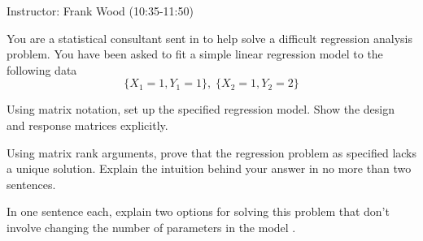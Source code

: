 \documentclass[12pt]{article}
\begin{document}
 \begin{center}
  Instructor: Frank Wood (10:35-11:50) 
 \end{center}
\studentinfo
{}
\finishfirstpage





{
You are a statistical consultant sent in to help solve a difficult regression analysis problem.  You have been asked to fit a simple linear regression model to the following data
\[ \{ X_1 = 1, Y_1 = 1 \}, \; \{ X_2 = 1, Y_2 = 2\}\]

\abcs
\item Using matrix notation, set up the specified regression model.  Show the design and response matrices explicitly.
\item Using matrix rank arguments, prove that the regression problem as specified lacks a unique solution.  Explain the intuition behind your answer in no more than two sentences.  
\item In one sentence each, explain two options for solving this problem that don't involve changing the number of parameters in the model .
\endabcs

}
{

\vfill
 \newpage

}
{
}
\end{document}
